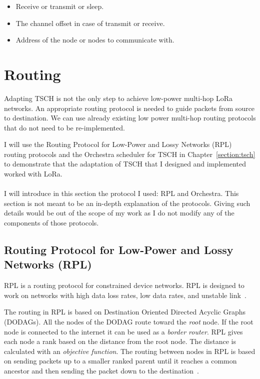 \begin{itemize}
  \item Receive or transmit or sleep.
  \item The channel offset in case of transmit or receive.
  \item Address of the node or nodes to communicate with.
\end{itemize}

\section{Routing}

Adapting TSCH is not the only step to achieve low-power
multi-hop LoRa networks.
An appropriate routing protocol is needed to guide packets from source to destination.
We can use already existing low power multi-hop routing protocols that do not need
to be re-implemented.

I will use the Routing Protocol for Low-Power and Lossy Networks (RPL) routing
protocols and the Orchestra scheduler for TSCH in
Chapter~\ref{section:tsch} to demonstrate that the adaptation of TSCH that
I designed and implemented worked with LoRa.

\paragraph{}

I will introduce in this section the protocol I used: RPL and Orchestra.
This section is not meant to be an in-depth explanation of the protocols.
Giving such details would be out of the scope of my work as I do not modify any
of the components of those protocols.

\subsection{Routing Protocol for Low-Power and Lossy Networks (RPL)}

RPL is a routing protocol for constrained device networks.
RPL is designed to work on networks with high data loss rates, low data rates, and
unstable link~\cite{rfc6550}.

The routing in RPL is based on Destination Oriented Directed Acyclic Graphs (DODAGs).
All the nodes of the DODAG route toward the \emph{root} node.
If the root node is connected to the internet it can be used as a \emph{border
router}.
RPL gives each node a rank based on the distance from the root node.
The distance is calculated with an \emph{objective function}.
The routing between nodes in RPL is based on sending packets up to a smaller
ranked parent until it reaches a common ancestor and then sending the packet down
to the destination~\cite{duquennoy2015}.

